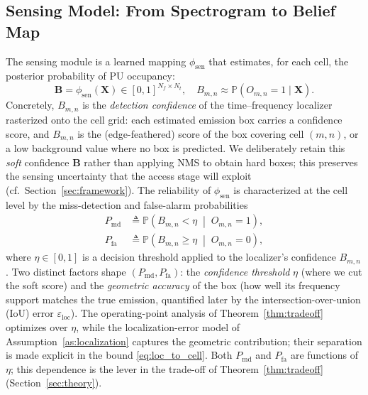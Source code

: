 \documentclass[journal]{IEEEtran}
\newcommand{\Prob}{\mathbb{P}}
\newcommand{\defeq}{\triangleq}
\newcommand{\spec}{\bm{X}}                 %
\newcommand{\Nf}{N_f}                      %
\newcommand{\Nt}{N_t}                      %
\newcommand{\occ}{O}                       %
\newcommand{\bel}{B}                       %
\newcommand{\belmap}{\bm{B}}               %
\newcommand{\Pmd}{P_{\mathrm{md}}}         %
\newcommand{\Pfa}{P_{\mathrm{fa}}}         %
\newcommand{\thr}{\eta}                    %
\newcommand{\eloc}{\varepsilon_{\mathrm{loc}}}
\begin{document}
\subsection{Sensing Model: From Spectrogram to Belief Map}
\label{subsec:sensing}
The sensing module is a learned mapping $\phi_{\mathrm{sen}}$ that estimates,
for each cell, the posterior probability of PU occupancy:
\begin{equation}
\belmap = \phi_{\mathrm{sen}}(\spec) \in [0,1]^{\Nf\times\Nt},
\quad
\bel_{m,n} \approx \Prob(\occ_{m,n}{=}1 \mid \spec).
\label{eq:belief}
\end{equation}
Concretely, $\bel_{m,n}$ is the \emph{detection confidence} of the
time--frequency localizer rasterized onto the cell grid: each estimated
emission box carries a confidence score, and $\bel_{m,n}$ is the (edge-feathered)
score of the box covering cell $(m,n)$, or a low background value where no box
is predicted. We deliberately retain this \emph{soft} confidence $\belmap$
rather than applying NMS to obtain hard boxes; this
preserves the sensing uncertainty that the access stage will exploit
(cf.\ Section~\ref{sec:framework}). The reliability of $\phi_{\mathrm{sen}}$
is characterized at the cell level by the miss-detection and false-alarm
probabilities
\begin{align}
\Pmd &\defeq \Prob\!\left(\bel_{m,n} < \thr \;\middle|\; \occ_{m,n}=1\right),
\label{eq:pmd}\\
\Pfa &\defeq \Prob\!\left(\bel_{m,n} \ge \thr \;\middle|\; \occ_{m,n}=0\right),
\label{eq:pfa}
\end{align}
where $\thr\in[0,1]$ is a decision threshold applied to the localizer's
confidence $\bel_{m,n}$. Two distinct factors shape $(\Pmd,\Pfa)$: the
\emph{confidence threshold} $\thr$ (where we cut the soft score) and the
\emph{geometric accuracy} of the box (how well its frequency support matches
the true emission, quantified later by the intersection-over-union (IoU)
error $\eloc$). The
operating-point analysis of Theorem~\ref{thm:tradeoff} optimizes over $\thr$,
while the localization-error model of Assumption~\ref{as:localization}
captures the geometric contribution; their separation is made explicit in the
bound \eqref{eq:loc_to_cell}. Both $\Pmd$ and $\Pfa$ are functions of $\thr$;
this dependence is the lever in the trade-off of
Theorem~\ref{thm:tradeoff} (Section~\ref{sec:theory}).
\end{document}
